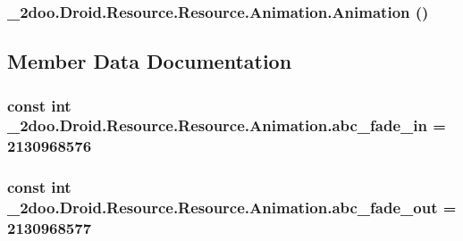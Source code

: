 \hypertarget{class__2doo_1_1_droid_1_1_resource_1_1_animation_a521e7a680799c6638237e391f559f8c}{
\subsubsection[{Animation}]{\setlength{\rightskip}{0pt plus 5cm}\_\-2doo.Droid.Resource.Resource.Animation.Animation ()}}
\label{class__2doo_1_1_droid_1_1_resource_1_1_animation_a521e7a680799c6638237e391f559f8c}




\subsection{Member Data Documentation}
\hypertarget{class__2doo_1_1_droid_1_1_resource_1_1_animation_dfc86c89ff41438954533b2bd1ffb623}{
\subsubsection[{abc\_\-fade\_\-in}]{\setlength{\rightskip}{0pt plus 5cm}const int \_\-2doo.Droid.Resource.Resource.Animation.abc\_\-fade\_\-in = 2130968576}}
\label{class__2doo_1_1_droid_1_1_resource_1_1_animation_dfc86c89ff41438954533b2bd1ffb623}


\hypertarget{class__2doo_1_1_droid_1_1_resource_1_1_animation_8da9c600f9e268db2a9f33a82aa57822}{
\subsubsection[{abc\_\-fade\_\-out}]{\setlength{\rightskip}{0pt plus 5cm}const int \_\-2doo.Droid.Resource.Resource.Animation.abc\_\-fade\_\-out = 2130968577}}
\label{class__2doo_1_1_droid_1_1_resource_1_1_animation_8da9c600f9e268db2a9f33a82aa57822}



